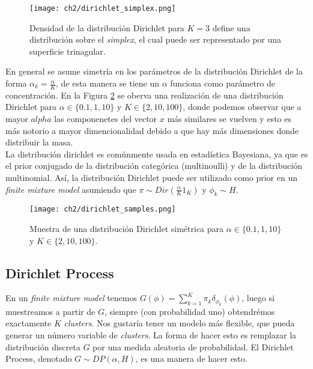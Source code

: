 \documentclass[letterpaper,12pt,oneside]{book} %
\begin{document}
\begin{figure}
    \centering
    \texttt{[image: ch2/dirichlet\_simplex.png]}
    \caption{Densidad de la distribución Dirichlet para $K=3$ define una distribución sobre el \textit{simplex}, el cual puede ser representado por una superficie trinagular.}
    \label{img:dirichlet_distribution}
\end{figure}

En general se asume simetría en los parámetros de la distribución Dirichlet de la forma $\alpha_{k}=\frac{\alpha}{K}$, de esta manera se tiene un $\alpha$ funciona como parámetro de concentración. En la Figura \ref{img:dirichlet_samples} se oberva una realización de una distribución Dirichlet para $\alpha \in \{0.1, 1, 10\}$ y $K\in\{2, 10, 100\}$, donde podemos observar que a mayor $alpha$ las componenetes del vector $x$ más similares se vuelven y esto es más notorio a mayor dimencionalidad debido a que hay más dimensiones donde distribuir la masa.\\

La distribución dirichlet es comúnmente usada en estadística Bayesiana, ya que es el prior conjugado de la distribución categórica (multinoulli) y de la distribución multinomial. Así, la distribución Dirichlet puede ser utilizado como prior en un \textit{finite mixture model} asumiendo que $\pi\sim Dir(\frac{\alpha}{K}1_{K})$ y $\phi_{k} \sim H$.

\begin{figure}
    \centering
    \texttt{[image: ch2/dirichlet\_samples.png]}
    \caption{Muestra de una distribución Dirichlet simétrica para $\alpha \in \{0.1, 1, 10\}$ y $K\in\{2, 10, 100\}$.}
    \label{img:dirichlet_samples}
\end{figure}




\subsection{Dirichlet Process}
\label{sec:dp}

En un \textit{finite mixture model} tenemos $G(\phi) = \sum_{k=1}^{K} \pi_{k}\delta_{\phi_{k}}(\phi)$, luego si muestreamos a partir de $G$, siempre (con probabilidad uno) obtendrémos exactamente $K$ \textit{clusters}. Nos gustaría tener un modelo más flexible, que pueda generar un número variable de \textit{clusters}. La forma de hacer esto es remplazar la distribución discreta $G$ por una medida aleatoria de probabilidad. El Dirichlet Process, denotado $G\sim DP(\alpha, H)$, es una manera de hacer esto.\\
\end{document}
